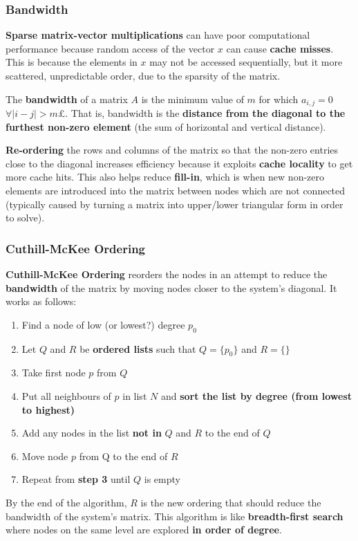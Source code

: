\documentclass{article}
\begin{document}
\subsubsection{Bandwidth}

\textbf{Sparse matrix-vector multiplications} can have poor computational performance because random access of the vector $x$ can cause \textbf{cache misses}. This is because the elements in $x$ may not be accessed sequentially, but it more scattered, unpredictable order, due to the sparsity of the matrix.

The \textbf{bandwidth} of a matrix $A$ is the minimum value of $m$ for which $a_{i,j} = 0$ $\forall |i - j| > m$£. That is, bandwidth is the \textbf{distance from the diagonal to the furthest non-zero element} (the sum of horizontal and vertical distance).

\textbf{Re-ordering} the rows and columns of the matrix so that the non-zero entries close to the diagonal increases efficiency because it exploits \textbf{cache locality} to get more cache hits. This also helps reduce \textbf{fill-in}, which is when new non-zero elements are introduced into the matrix between nodes which are not connected (typically caused by turning a matrix into upper/lower triangular form in order to solve).

\subsubsection{Cuthill-McKee Ordering}

\textbf{Cuthill-McKee Ordering} reorders the nodes in an attempt to reduce the \textbf{bandwidth} of the matrix by moving nodes closer to the system's diagonal. It works as follows:
\begin{enumerate}
	\item Find a node of low (or lowest?) degree $p_0$
	\item Let $Q$ and $R$ be \textbf{ordered lists} such that $Q = \lbrace p_0 \rbrace$ and $R = \lbrace \rbrace$
	\item Take first node $p$ from $Q$
	\item Put all neighbours of $p$ in list $N$ and \textbf{sort the list by degree (from lowest to highest)}
	\item Add any nodes in the list \textbf{not in} $Q$ and $R$ to the end of $Q$
	\item Move node $p$ from Q to the end of $R$
	\item Repeat from \textbf{step 3} until $Q$ is empty
\end{enumerate}
By the end of the algorithm, $R$ is the new ordering that should reduce the bandwidth of the system's matrix. This algorithm is like \textbf{breadth-first search} where nodes on the same level are explored \textbf{in order of degree}.
\end{document}
